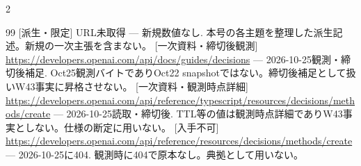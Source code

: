\documentclass[lualatex,a4paper,10pt]{jlreq}
\begin{document}
\begin{multicols}{2}
{\begin{thebibliography}{99}
 [派生・限定] URL未取得 --- 新規数値なし. 本号の各主題を整理した派生記述。新規の一次主張を含まない。
 [一次資料・締切後観測] \url{https://developers.openai.com/api/docs/guides/decisions} --- 2026-10-25観測・締切後補足. Oct25観測バイトでありOct22 snapshotではない。締切後補足として扱いW43事実に昇格させない。
 [一次資料・観測時点詳細] \url{https://developers.openai.com/api/reference/typescript/resources/decisions/methods/create} --- 2026-10-25読取・締切後. TTL等の値は観測時点詳細でありW43事実としない。仕様の断定に用いない。
 [入手不可] \url{https://developers.openai.com/api/reference/resources/decisions/methods/create} --- 2026-10-25に404. 観測時に404で原本なし。典拠として用いない。
\end{thebibliography}}

\end{multicols} %
\end{document}
